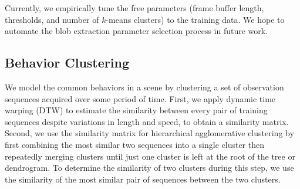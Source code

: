 

Currently, we empirically tune the free parameters (frame buffer
length, thresholds, and number of $k$-means clusters) to the training
data. We hope to automate the blob extraction parameter selection
process in future work.

\subsection{Behavior Clustering}
\label{sec:clustering-behavior-clustering}

We model the common behaviors in a scene by clustering a set of
observation sequences acquired over some period of time. First, we
apply dynamic time warping (DTW) to estimate the similarity between
every pair of training sequences despite variations in length and
speed, to obtain a similarity matrix. Second, we use the similarity
matrix for hierarchical agglomerative clustering by first combining
the most similar two sequences into a single cluster then repeatedly
merging clusters until just one cluster is left at the root of the
tree or dendrogram.  To determine the similarity of two clusters
during this step, we use the similarity of the most similar pair of
sequences between the two clusters.

